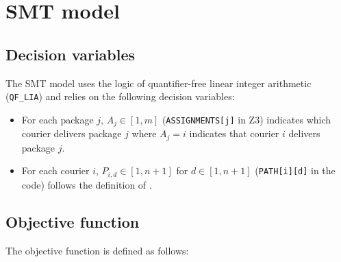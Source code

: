 \section{SMT model}


\subsection{Decision variables}

The SMT model uses the logic of quantifier-free linear integer arithmetic (\texttt{QF\_LIA}) and relies on the following decision variables:

\begin{itemize}
    \item For each package $j$, $A_j \in [1, m]$ (\texttt{ASSIGNMENTS[j]} in Z3) indicates which courier delivers package $j$ where $A_j = i$ indicates that courier $i$ delivers package $j$.
    
    \item For each courier $i$, $P_{i,d} \in [1, n+1]$ for $d \in [1, n+1]$ (\texttt{PATH[i][d]} in the code) follows the definition of .

\end{itemize}





\subsection{Objective function}
The objective function is defined as follows:

